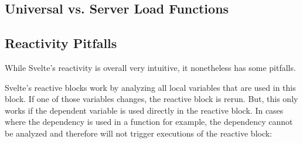 

\subsection{Universal vs. Server Load Functions}



\subsection{Reactivity Pitfalls}

While Svelte's reactivity is overall very intuitive, it nonetheless has some pitfalls.

Svelte's reactive blocks work by analyzing all local variables that are used in this block. If one of those variables changes, the reactive block is rerun. But, this only works if the dependent variable is used directly in the reactive block. In cases where the dependency is used in a function for example, the dependency cannot be analyzed and therefore will not trigger executions of the reactive block:

